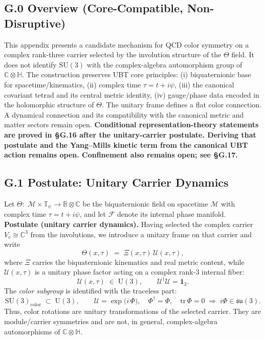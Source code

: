 \subsection*{G.0 Overview (Core-Compatible, Non-Disruptive)}
This appendix presents a candidate mechanism for QCD color symmetry on a complex rank-three carrier selected by the involution structure of the $\Theta$ field.  It does not identify $\mathrm{SU}(3)$ with the complex-algebra automorphism group of $\mathbb{C}\otimes\mathbb{H}$. The construction preserves UBT core principles:
(i) biquaternionic base for spacetime/kinematics, 
(ii) complex time $\tau=t+i\psi$, 
(iii) the canonical covariant tetrad and its central metric identity,
(iv) gauge/phase data encoded in the holomorphic structure of $\Theta$.
The unitary frame defines a flat color connection. A dynamical connection and its compatibility with the canonical metric and matter sectors remain open.
\textbf{Conditional representation-theory statements are proved in \S G.16 after the unitary-carrier postulate.  Deriving that postulate and the Yang--Mills kinetic term from the canonical UBT action remains open.  Confinement also remains open; see \S G.17.}

\subsection*{G.1 Postulate: Unitary Carrier Dynamics}
Let $\Theta:\; \mathcal{M}\times \mathbb{T}_\psi \to \mathbb{B}\otimes \mathbb{C}$ be the biquaternionic field on spacetime $\mathcal{M}$ with complex time $\tau=t+i\psi$, 
and let $\mathcal{F}$ denote its internal phase manifold. 
\textbf{Postulate (unitary carrier dynamics).}  Having selected the complex carrier $V_c\cong\mathbb{C}^3$ from the involutions, we introduce a unitary frame on that carrier and write
\begin{equation}
\label{eq:G1_theta_factorization}
\Theta(x,\tau)\;=\; \Xi(x,\tau)\,\mathcal{U}(x,\tau),
\end{equation}
where $\Xi$ carries the biquaternionic kinematics and real metric content, while 
$\mathcal{U}(x,\tau)$ is a unitary phase factor acting on a complex rank-$3$ internal fiber:
\begin{equation}
\mathcal{U}(x,\tau)\;\in\;\mathrm{U}(3), 
\qquad \mathcal{U}^\dagger\mathcal{U}=\mathbf{1}_3.
\end{equation}
The \emph{color subgroup} is identified with the traceless part:
\begin{equation}
\label{eq:G1_su3_subgroup}
\mathrm{SU}(3)_{\text{color}}\;\subset\;\mathrm{U}(3), 
\qquad \mathcal{U}=\exp\big(i\,\Phi\big),\quad \Phi^\dagger=\Phi,\quad \mathrm{tr}\,\Phi=0 \;\Rightarrow\; i\Phi\in\mathfrak{su}(3).
\end{equation}
Thus, color rotations are unitary transformations of the selected carrier.  They are module/carrier symmetries and are not, in general, complex-algebra automorphisms of $\mathbb{C}\otimes\mathbb{H}$.


